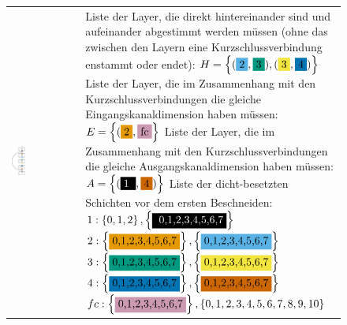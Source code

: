\begin{figure}
\begin{minipage}[c]{1\linewidth}
\begin{tabularx}{1\linewidth}{m{0.22\linewidth}m{0.88\linewidth}} \includegraphics[width=0.21\textwidth]{KapitelPartA/images/net.png} &Liste der Layer, die direkt hintereinander sind und aufeinander abgestimmt werden müssen (ohne das zwischen den Layern eine Kurzschlussverbindung enstammt oder endet): $H=\left\{(\colorbox{sky}{2},\colorbox{bluegreen}{3}),(\colorbox{yellow}{3},\colorbox{blue2}{4}) \right\}$\newline
Liste der Layer, die im Zusammenhang mit den Kurzschlussverbindungen die gleiche Eingangskanaldimension haben müssen: \newline$E=\left\{(\colorbox{orange}{2},\colorbox{purple}{fc} \right\}$ \newline
Liste der Layer, die im Zusammenhang mit den Kurzschlussverbindungen die gleiche Ausgangskanaldimension haben müssen: $A=\left\{ ( \colorbox{black}{\textcolor{white}{1} },\colorbox{vermi}{4} ) \right\} $ \newline
Liste der dicht-besetzten Schichten vor dem ersten Beschneiden:\newline
$1:\left\{0,1,2\right\},\left\{\colorbox{black}{ \textcolor{white}{0,1,2,3,4,5,6,7}} \right\}$ \newline
$2:\left\{\colorbox{orange}{0,1,2,3,4,5,6,7}\right\},\left\{\colorbox{sky}{0,1,2,3,4,5,6,7}\right\}$\newline
$3:\left\{\colorbox{bluegreen}{0,1,2,3,4,5,6,7}\right\},\left\{\colorbox{yellow}{0,1,2,3,4,5,6,7}\right\}$\newline
$4:\left\{\colorbox{blue2}{0,1,2,3,4,5,6,7}\right\},\left\{\colorbox{vermi}{0,1,2,3,4,5,6,7}\right\}$\newline
$fc:\left\{\colorbox{purple}{0,1,2,3,4,5,6,7}\right\},\left\{0,1,2,3,4,5,6,7,8,9,10\right\}$ \newline


\end{tabularx}
\end{minipage}
\end{figure}
